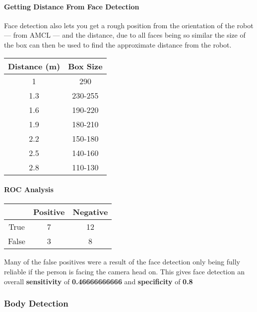 \documentclass[12pt]{article}
\begin{document}
\paragraph{Getting Distance From Face Detection}

Face detection also lets you get a rough position from the orientation of the robot --- from AMCL --- and the distance, due to all faces being so similar the size of the box can then be used to find the approximate distance from the robot.

\begin{center}
\begin{tabular}{|c|c|}
\hline
Distance (m) & Box Size\\ %
\hline
1 & 290 \\
1.3	& 230-255 \\
1.6	& 190-220\\
1.9	& 180-210\\
2.2	& 150-180\\
2.5	& 140-160\\
2.8	& 110-130\\


\hline
\end{tabular}
\end{center}

\paragraph{ROC Analysis}

\begin{center}
\begin{tabular}{|c|c|c|}
\hline
& Positive & Negative\\
\hline
True & 7 & 12 \\
False & 3 & 8 \\

\hline
\end{tabular}
\end{center}
Many of the false positives were a result of the face detection only being fully reliable if the person is facing the camera head on.
This gives face detection an overall \textbf{sensitivity} of \textbf{0.46666666666} and \textbf{specificity} of \textbf{0.8}


\subsubsection{Body Detection}
\end{document}
